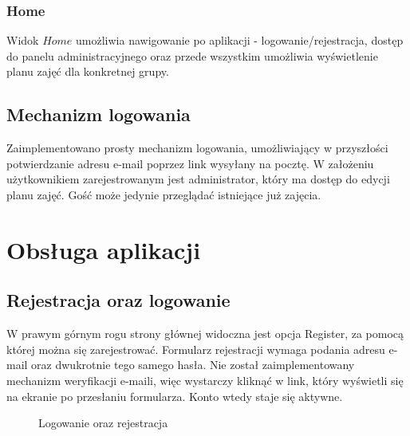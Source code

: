 \documentclass[]{article}
\begin{document}
\subsubsection{Home}
Widok $Home$ umożliwia nawigowanie po aplikacji - logowanie/rejestracja, dostęp do panelu administracyjnego oraz przede wszystkim umożliwia wyświetlenie planu zajęć dla konkretnej grupy.

\subsection{Mechanizm logowania}
Zaimplementowano prosty mechanizm logowania, umożliwiający w przyszłości potwierdzanie adresu e-mail poprzez link wysyłany na pocztę. W założeniu użytkownikiem zarejestrowanym jest administrator, który ma dostęp do edycji planu zajęć. Gość może jedynie przeglądać istniejące już zajęcia.

\section{Obsługa aplikacji}
\subsection{Rejestracja oraz logowanie}
W prawym górnym rogu strony głównej widoczna jest opcja Register, za pomocą której można się zarejestrować. Formularz rejestracji wymaga podania adresu e-mail oraz dwukrotnie tego samego hasła. Nie został zaimplementowany mechanizm weryfikacji e-maili, więc wystarczy kliknąć w link, który wyświetli się na ekranie po przesłaniu formularza. Konto wtedy staje się aktywne.


\begin{figure}[H]%
    \centering
    \qquad
    \caption{Logowanie oraz rejestracja}%
\end{figure}
\end{document}
